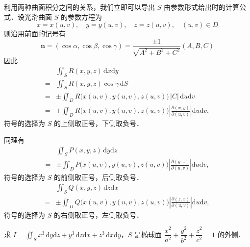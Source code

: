 利用两种曲面积分之间的关系，我们立即可以导出 $S$ 由参数形式给出时的计算公式．设光滑曲面 $S$ 的参数方程为
\[
x=x(u,v),\quad y=y(u,v),\quad z=z(u,v),\quad(u,v)\in D
\]
则沿用前面的记号有
\[
\bm{n}=(\cos\alpha,\cos\beta,\cos\gamma)=\frac{\pm1}{\sqrt{A^{2}+B^{2}+C^{2}}}(A,B,C)
\]
因此
\[
\begin{aligned}
&\iint_{S}R(x,y,z)\,\mathrm{d}x\mathrm{d}y\\
={}&\iint_{S}R(x,y,z)\cos\gamma\,\mathrm{d}S\\
={}&\pm\iint_{D}R\big(x(u,v),y(u,v),z(u,v)\big)\,|C|\,\mathrm{d}u\mathrm{d}v\\
={}&\pm\iint_{D}R\big(x(u,v),y(u,v),z(u,v)\big)\left|\frac{\partial(x,y)}{\partial(u,v)}\right|\mathrm{d}u\mathrm{d}v,
\end{aligned}
\]
符号的选择为 $S$ 的上侧取正号，下侧取负号．

同理有
\[
\begin{aligned}
&\iint_{S}P(x,y,z)\,\mathrm{d}y\mathrm{d}z\\
={}&\pm\iint_{D}P\big(x(u,v),y(u,v),z(u,v)\big)\left|\frac{\partial(y,z)}{\partial(u,v)}\right|\mathrm{d}u\mathrm{d}v,
\end{aligned}
\]
符号的选择为 $S$ 的前侧取正号，后侧取负号．
\[
\begin{aligned}
&\iint_{S}Q(x,y,z)\,\mathrm{d}z\mathrm{d}x\\
={}&\pm\iint_{D}Q\big(x(u,v),y(u,v),z(u,v)\big)\left|\frac{\partial(z,x)}{\partial(u,v)}\right|\mathrm{d}u\mathrm{d}v,
\end{aligned}
\]
符号的选择为 $S$ 的右侧取正号，左侧取负号．

\begin{example}\label{ex:21-4-3}
求 $I=\displaystyle\iint_{S}x^{3}\,\mathrm{d}y\mathrm{d}z+y^{3}\,\mathrm{d}z\mathrm{d}x+z^{3}\,\mathrm{d}x\mathrm{d}y$，$S$ 是椭球面 $\dfrac{x^{2}}{a^{2}}+\dfrac{y^{2}}{b^{2}}+\dfrac{z^{2}}{c^{2}}=1$ 的外侧．
\end{example}

